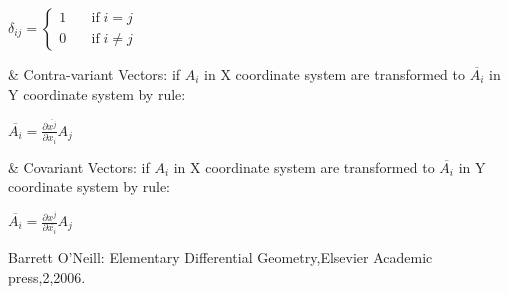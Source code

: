 \documentclass[11pt]{extarticle}
\begin{document}
\begin{multicols}{2}
$\delta_{ij}=
\begin{cases}
1 &\quad \text{if}\; i=j\\
0 &\quad \text{if}\; i\neq j
\end{cases}$

\begin{easylist}
& Contra-variant Vectors: if $A_i$ in X coordinate system are transformed to $\overline{A_i}$ in Y coordinate system by rule:
\begin{center}
$\overline{A_i}=\frac{\partial \overline{x^j}}{\partial{x_i}}A_j$
\end{center}
& Covariant Vectors: if $A_i$ in X coordinate system are transformed to $\overline{A_i}$ in Y coordinate system by rule:
\begin{center}
$\overline{A_i}=\frac{\partial x^j}{\partial \overline{x_i}}A_j$
\end{center}
\end{easylist}
\begin{thebibliography}{9}
    Barrett O'Neill: Elementary Differential Geometry,Elsevier Academic press,2,2006. 

\end{thebibliography}
\end{multicols}
\end{document}
